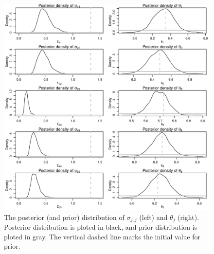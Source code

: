 \documentclass[12pt]{article}
\begin{document}
\begin{figure}[htbp]
	\centering
	\includegraphics[width=.9\textwidth]{pic/0.15/Posterior_vs_Prior.pdf}
	\caption{The posterior (and prior) distribution of $\sigma_{j, j}$ (left) and $\theta_j$ (right). Posterior distribution is ploted in black, and prior distribution is ploted in gray. The vertical dashed line marks the initial value for prior.}
	\label{fig:0.15-Posterior_vs_Prior}
\end{figure}

\newpage
\end{document}
